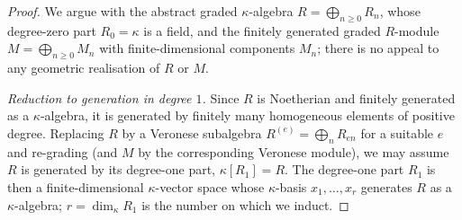 \begin{proof}
    \leanok
  We argue with the abstract graded \(\kappa\)-algebra
  \(R = \bigoplus_{n \ge 0} R_n\), whose degree-zero part \(R_0 = \kappa\) is a
  field, and the finitely generated graded \(R\)-module
  \(M = \bigoplus_{n \ge 0} M_n\) with finite-dimensional components \(M_n\);
  there is no appeal to any geometric realisation of \(R\) or \(M\).

  \emph{Reduction to generation in degree \(1\).} Since \(R\) is Noetherian and
  finitely generated as a \(\kappa\)-algebra, it is generated by finitely many
  homogeneous elements of positive degree. Replacing \(R\) by a Veronese
  subalgebra \(R^{(e)} = \bigoplus_n R_{en}\) for a suitable \(e\) and re-grading
  (and \(M\) by the corresponding Veronese module), we may assume \(R\) is
  generated by its degree-one part, \(\kappa[R_1] = R\). The degree-one part
  \(R_1\) is then a finite-dimensional \(\kappa\)-vector space whose \(\kappa\)-basis
  \(x_1, \dots, x_r\) generates \(R\) as a \(\kappa\)-algebra; \(r = \dim_\kappa R_1\)
  is the number on which we induct.


\end{proof}
